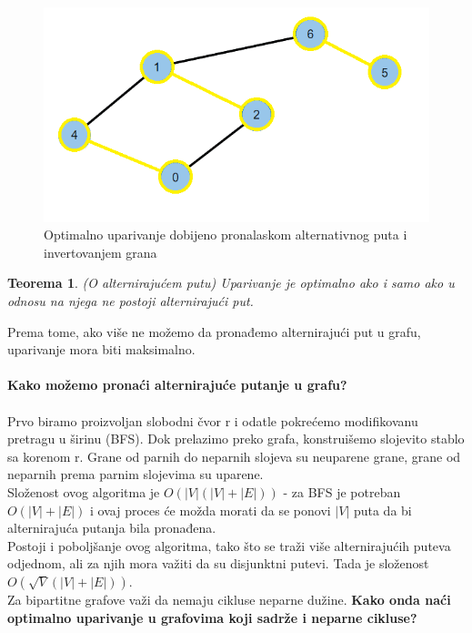 \documentclass[11pt,a4paper]{article}
\theoremstyle{definition}
\newtheorem{teorema}{Teorema}
\begin{document}
\begin{figure}[H]
\begin{center}
\includegraphics[scale=0.7]{Graf 2 - optimalan.png}
\end{center}
\caption{Optimalno uparivanje dobijeno pronalaskom alternativnog puta i invertovanjem grana}
\label{graf 2 optimalan}
\end{figure}


\begin{teorema}
\textsl{(O alternirajućem putu) Uparivanje je optimalno ako i samo ako u odnosu na njega ne postoji alternirajući put.}
\end{teorema}
 Prema tome, ako više ne možemo da pronađemo alternirajući put u grafu, uparivanje mora biti maksimalno.\\ \\
\textbf{Kako možemo pronaći alternirajuće putanje u grafu?} \\ \\ Prvo biramo proizvoljan slobodni čvor r i odatle pokrećemo modifikovanu pretragu u širinu (BFS). Dok prelazimo preko grafa, konstruišemo slojevito stablo sa korenom r. Grane od parnih do neparnih slojeva su neuparene grane, grane od neparnih prema parnim slojevima su uparene.\\
 Složenost ovog algoritma je $O(|V|(|V|+|E|))$ - za BFS je potreban $O(|V|+|E|)$ i ovaj proces će možda morati da se ponovi $|V|$ puta da bi alternirajuća putanja bila pronađena.\\ Postoji i poboljšanje ovog algoritma, tako što se traži više alternirajućih puteva odjednom, ali za njih mora važiti da su disjunktni putevi. Tada je složenost $O(\sqrt{V}(|V|+|E|))$.\\

Za bipartitne grafove važi da nemaju cikluse neparne dužine. \textbf{Kako onda naći optimalno uparivanje u grafovima koji sadrže i neparne cikluse?}
\end{document}
